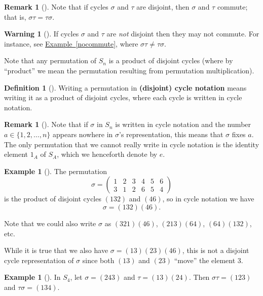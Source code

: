 \documentclass[10pt,]{book}
\newcommand{\terminology}[1]{\textbf{#1}}
\theoremstyle{plain}
\theoremstyle{definition}
\newtheorem{definition}[theorem]{Definition}
\theoremstyle{definition}
\newtheorem{remark}[theorem]{Remark}
\newtheorem{warning}[theorem]{Warning}
\theoremstyle{definition}
\newtheorem{example}[theorem]{Example}
\theoremstyle{definition}
\numberwithin{equation}{section}
\newcommand{\amp}{&}
\begin{document}
\begin{remark}[]\label{remark-26}
Note that if cycles \(\sigma\) and \(\tau\) are disjoint, then \(\sigma\) and \(\tau\) commute; that is, \(\sigma \tau=\tau \sigma\).%
\end{remark}
\begin{warning}[]\label{warning-20}
If cycles \(\sigma\) and \(\tau\) are \emph{not} disjoint then they may not commute. For instance, see \hyperref[nocommute]{Example~\ref{nocommute}}, where \(\sigma\tau \neq \tau \sigma\).%
\end{warning}
Note that any permutation of \(S_n\) is a product of disjoint cycles (where by ``product'' we mean the permutation resulting from permutation multiplication).%
\begin{definition}[{}]\label{definition-48}
Writing a permutation in \terminology{(disjoint) cycle notation} means writing it as a product of disjoint cycles, where each cycle is written in cycle notation.%
\end{definition}
\begin{remark}[]\label{remark-27}
Note that if \(\sigma\) in \(S_n\) is written in cycle notation and the number \(a\in \{1,2,\ldots, n\}\) appears nowhere in \(\sigma\)'s representation, this means that \(\sigma\) fixes \(a\). The only permutation that we cannot really write in cycle notation is the identity element \(1_A\) of \(S_A\), which we henceforth denote by \(e\).%
\end{remark}
\begin{example}[]\label{example-53}
The permutation%
\begin{equation*}
\sigma =\begin{pmatrix}1\amp 2\amp 3\amp 4\amp 5\amp 6\\ 3\amp 1\amp 2\amp 6\amp 5\amp 4
\end{pmatrix}
\end{equation*}
is the product of disjoint cycles \((132)\) and \((46)\), so in cycle notation we have%
\begin{equation*}
\sigma=(132)(46).
\end{equation*}
%
\par
Note that we could also write \(\sigma\) as \((321)(46)\), \((213)(64)\), \((64)(132)\), etc.%
\par
While it is true that we also have \(\sigma=(13)(23)(46)\), this is not a disjoint cycle representation of \(\sigma\) since both \((13)\) and \((23)\) ``move'' the element \(3\).%
\end{example}
\begin{example}[]\label{example-54}
In \(S_4\), let \(\sigma=(243)\) and \(\tau=(13)(24)\). Then \(\sigma \tau=(123)\) and \(\tau \sigma = (134).\)%
\end{example}
\end{document}
